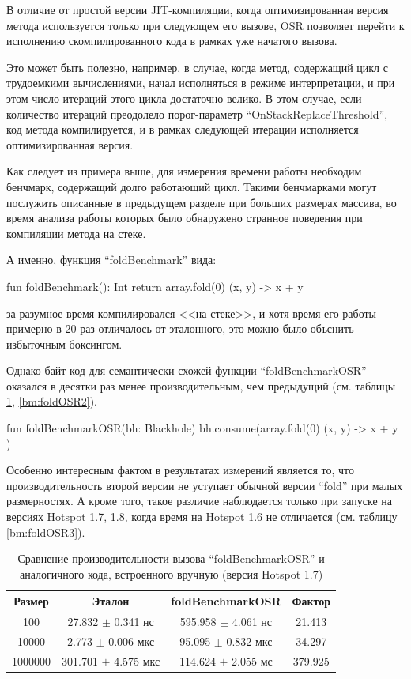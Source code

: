 В отличие от простой версии JIT-компиляции, когда оптимизированная версия метода используется
только при следующем его вызове, OSR позволяет перейти к исполнению скомпилированного кода в рамках
уже начатого вызова.

Это может быть полезно, например, в случае, когда метод, содержащий цикл с трудоемкими вычислениями,
начал исполняться в режиме интерпретации, и при этом число итераций этого цикла достаточно велико.
В этом случае, если количество итераций преодолело порог-параметр ``OnStackReplaceThreshold'',
код метода компилируется, и в рамках следующей итерации исполняется оптимизированная версия.

Как следует из примера выше, для измерения времени работы необходим бенчмарк, содержащий долго
работающий цикл.
Такими бенчмарками могут послужить описанные в предыдущем разделе при больших размерах массива,
во время анализа работы которых было обнаружено странное поведения при компиляции метода на стеке.

А именно, функция ``foldBenchmark'' вида:
\begin{pyglist}[language=kotlin]
    fun foldBenchmark(): Int {
        return array.fold(0) { (x, y) -> x + y }
    }
\end{pyglist}

за разумное время компилировался <<на стеке>>, и хотя время его работы примерно в 20 раз
отличалось от эталонного, это можно было объснить избыточным боксингом.

Однако байт-код для семантически схожей функции ``foldBenchmarkOSR'' оказался в десятки раз менее
производительным, чем предыдущий (см. таблицы \ref{bm:foldOSR}, \ref{bm:foldOSR2}).
\begin{pyglist}[language=kotlin]
    fun foldBenchmarkOSR(bh: Blackhole) {
        bh.consume(array.fold(0) { (x, y) -> x + y })
    }
\end{pyglist}

Особенно интересным фактом в результатах измерений является то, что производительность второй
версии не уступает обычной версии ``fold'' при малых размерностях.
А кроме того, такое различие наблюдается только при запуске на версиях Hotspot 1.7, 1.8, когда
время на Hotspot 1.6 не отличается (см. таблицу \ref{bm:foldOSR3}).

\begin{table}[h]
\begin{center}
\begin{tabular}{|c|c|c|c|} \hline
Размер & Эталон & foldBenchmarkOSR & Фактор \\ \hline
100 & 27.832 $\pm$ 0.341 нс & 595.958 $\pm$ 4.061 нс & 21.413\\ \hline
10000 & 2.773 $\pm$ 0.006 мкс & 95.095 $\pm$ 0.832 мкс & 34.297\\ \hline
1000000 & 301.701 $\pm$ 4.575 мкс & 114.624 $\pm$ 2.055 мс & 379.925\\ \hline
\end{tabular}
\caption{Сравнение производительности вызова ``foldBenchmarkOSR'' и аналогичного кода, встроенного вручную (версия Hotspot 1.7)}
\label{bm:foldOSR}
\end{center}
\end{table}


